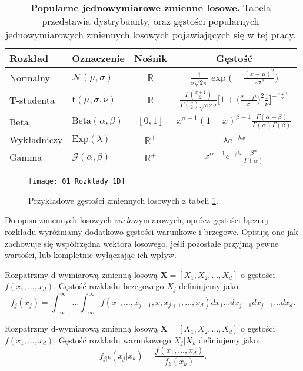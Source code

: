 \begin{table}[h]
	\caption{\textbf{Popularne jednowymiarowe zmienne losowe.} Tabela przedstawia dystrybuanty, oraz gęstości popularnych jednowymiarowych zmiennych losowych pojawiających się w tej pracy.}
	\label{tab:przykladowe_zmienne_losowe}
	\centering
	\begin{tabular}{ll|c|c}
		\hline
		\textbf{Rozkład} & \textbf{Oznaczenie} & \textbf{Nośnik} & \textbf{Gęstość} \\
		\hline
		Normalny & $\mathcal{N}(\mu, \sigma)$ & $\mathbb{R}$ & $\frac{1}{\sigma \sqrt{2 \pi}} \exp\big(-\frac{(x-\mu)^2}{2\sigma^2}\big)$\\ 
		T-studenta & $\text{t}(\mu, \sigma, \nu)$ & $\mathbb{R}$ & $ \frac{\Gamma(\frac{\nu + 1}{2})}{\Gamma(\frac{\nu}{2})\sqrt{\pi\nu}\sigma} \bigg[1 + \big(\frac{x - \mu}{\sigma}\big)^2\frac{1}{\nu}\bigg]^{-\frac{\nu + 1}{2}} $ \\ 
		Beta & $\text{Beta}(\alpha, \beta)$ & $[0, 1]$ & $ x^{\alpha - 1}(1 - x)^{\beta - 1}\frac{\Gamma(\alpha + \beta)}{\Gamma(\alpha)\Gamma(\beta)}$ \\ 
		Wykładniczy & $\text{Exp}(\lambda)$ & $\mathbb{R}^{+}$ & $ \lambda e^{-\lambda x}$ \\
		Gamma & $\mathcal{G}(\alpha, \beta)$ & $\mathbb{R}^+$ & $x^{\alpha - 1}e^{-\beta x}\frac{\beta^\alpha}{\Gamma(\alpha)}$\\ 
		
		\hline
	\end{tabular}
\end{table}

\begin{figure}[H]
	\centering
	\texttt{[image: 01\_Rozklady\_1D]}
	\caption{Przykładowe gęstości zmiennych losowych z tabeli \ref{tab:przykladowe_zmienne_losowe}.\label{fig:przykladowe_zmienne_losowe}}
\end{figure}

Do opisu zmiennych losowych \emph{wielo}wymiarowych, oprócz gęstości łącznej rozkładu wyróżniamy dodatkowo gęstości warunkowe i brzegowe. Opisują one jak zachowuje się współrzędna wektora losowego, jeśli pozostałe przyjmą pewne wartości, lub kompletnie wyłączając ich wpływ.

\begin{df}
	Rozpatrzmy d-wymiarową zmienną losową $\mathbf{X} = [X_1, X_2, \dots, X_d]$ o gęstości $f(x_1, \dots, x_d)$. Gęstość rozkładu brzegowego $X_j$ definiujemy jako:
	$$f_j(x_j)=\int_{-\infty}^{\infty}\dots\int_{-\infty}^{\infty} f(x_1, \dots, x_{j-1}, x, x_{j+1}, \dots, x_d)  dx_1\dots dx_{j-1} dx_{j+1} \dots dx_d.$$
\end{df}

\begin{df}
	Rozpatrzmy d-wymiarową zmienną losową $\mathbf{X} = [X_1, X_2, \dots, X_d]$ o gęstości $f(x_1, \dots, x_d)$. Gęstość rozkładu warunkowego $X_j \vert X_k$ definiujemy jako:
	$$f_{j|k}(x_j|x_k) = \frac{f(x_1, \dots, x_d)}{f_k(x_k)}.$$
\end{df}
